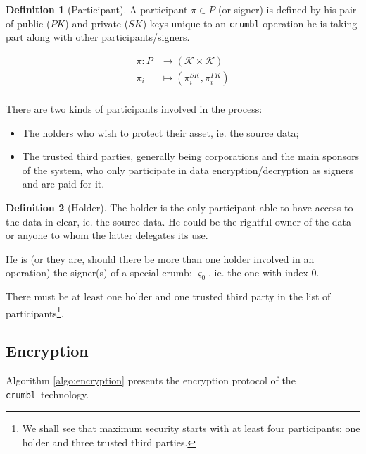 \documentclass[twoside,twocolumn]{article}
\theoremstyle{definition}
\newtheorem{definition}{Definition}
\theoremstyle{remark}
\begin{document}
\begin{definition}[Participant]
    \label{participant}
    A participant $\pi \in P$ (or signer) is defined by his pair of public ($PK$) and private ($SK$) keys unique to an \texttt{crumbl} operation 
    he is taking part along with other participants/signers.

    \begin{equation}
        \label{eq:participant}
        \begin{array}{rl}
            \pi: P &\to (\mathcal{K} \times \mathcal{K}) \\
                \pi_i &\mapsto (\pi_i^{SK}, \pi_i^{PK}) \\
        \end{array}
    \end{equation}

    There are two kinds of participants involved in the process:
    \begin{itemize}
        \item The holders who wish to protect their asset, ie. the source data;
        \item The trusted third parties, generally being corporations and the main sponsors of the system, who only participate in data 
            encryption/decryption as signers and are paid for it.
    \end{itemize}
\end{definition}

\begin{definition}[Holder]
    The holder is the only participant able to have access to the data in clear, ie. the source data.
    He could be the rightful owner of the data or anyone to whom the latter delegates its use.

    He is (or they are, should there be more than one holder involved in an operation) the signer(s) of a special crumb: $\varsigma_0$, ie. the one 
    with index $0$.
\end{definition}

There must be at least one holder and one trusted third party in the list of participants\footnote{We shall see that maximum security starts with at 
least four participants: one holder and three trusted third parties.}.

\subsection{Encryption}

Algorithm \ref{algo:encryption} presents the encryption protocol of the \texttt{crumbl}\textregistered~technology.
\end{document}
